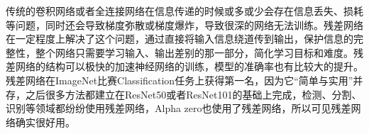 
传统的卷积网络或者全连接网络在信息传递的时候或多或少会存在信息丢失、损耗等问题，同时还会导致梯度弥散或梯度爆炸，导致很深的网络无法训练。残差网络在一定程度上解决了这个问题，通过直接将输入信息绕道传到输出，保护信息的完整性，整个网络只需要学习输入、输出差别的那一部分，简化学习目标和难度。残差网络的结构可以极快的加速神经网络的训练，模型的准确率也有比较大的提升。残差网络在ImageNet比赛Classification任务上获得第一名，因为它“简单与实用”并存，之后很多方法都建立在ResNet50或者ResNet101的基础上完成，检测、分割、识别等领域都纷纷使用残差网络，Alpha zero也使用了残差网络，所以可见残差网络确实很好用。

